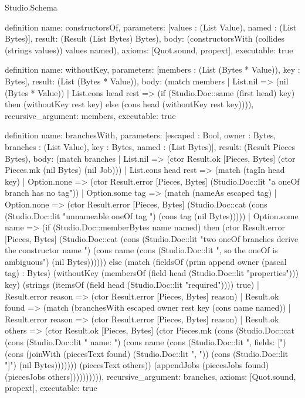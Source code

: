 \begin{lexlean}{Studio.Schema}
\begin{semanticmodule}
definition{
  name: constructorsOf,
  parameters: [values : (List Value), named : (List Bytes)],
  result: (Result (List Bytes) Bytes),
  body: (constructorsWith (collides (strings values)) values named),
  axioms: [Quot.sound, propext],
  executable: true
}

definition{
  name: withoutKey,
  parameters: [members : (List (Bytes * Value)), key : Bytes],
  result: (List (Bytes * Value)),
  body: (match members
    | List.nil => (nil (Bytes * Value))
    | List.cons head rest => (if (Studio.Doc::same (first head) key) then (withoutKey rest key) else (cons head (withoutKey rest key)))),
  recursive_argument: members,
  executable: true
}

definition{
  name: branchesWith,
  parameters: [escaped : Bool, owner : Bytes, branches : (List Value), key : Bytes, named : (List Bytes)],
  result: (Result Pieces Bytes),
  body: (match branches
    | List.nil => (ctor Result.ok [Pieces, Bytes] (ctor Pieces.mk (nil Bytes) (nil Job)))
    | List.cons head rest => (match (tagIn head key)
      | Option.none => (ctor Result.error [Pieces, Bytes] (Studio.Doc::lit "a oneOf branch has no tag"))
      | Option.some tag => (match (nameAs escaped tag)
        | Option.none => (ctor Result.error [Pieces, Bytes] (Studio.Doc::cat (cons (Studio.Doc::lit "unnameable oneOf tag ") (cons tag (nil Bytes)))))
        | Option.some name => (if (Studio.Doc::memberBytes name named) then (ctor Result.error [Pieces, Bytes] (Studio.Doc::cat (cons (Studio.Doc::lit "two oneOf branches derive the constructor name ") (cons name (cons (Studio.Doc::lit ", so the oneOf is ambiguous") (nil Bytes)))))) else (match (fieldsOf (prim append owner (pascal tag) : Bytes) (withoutKey (membersOf (field head (Studio.Doc::lit "properties"))) key) (strings (itemsOf (field head (Studio.Doc::lit "required")))) true)
          | Result.error reason => (ctor Result.error [Pieces, Bytes] reason)
          | Result.ok found => (match (branchesWith escaped owner rest key (cons name named))
            | Result.error reason => (ctor Result.error [Pieces, Bytes] reason)
            | Result.ok others => (ctor Result.ok [Pieces, Bytes] (ctor Pieces.mk (cons (Studio.Doc::cat (cons (Studio.Doc::lit "    {name: ") (cons name (cons (Studio.Doc::lit ", fields: [") (cons (joinWith (piecesText found) (Studio.Doc::lit ", ")) (cons (Studio.Doc::lit "]}") (nil Bytes))))))) (piecesText others)) (appendJobs (piecesJobs found) (piecesJobs others)))))))))),
  recursive_argument: branches,
  axioms: [Quot.sound, propext],
  executable: true
}


\end{semanticmodule}
\end{lexlean}
